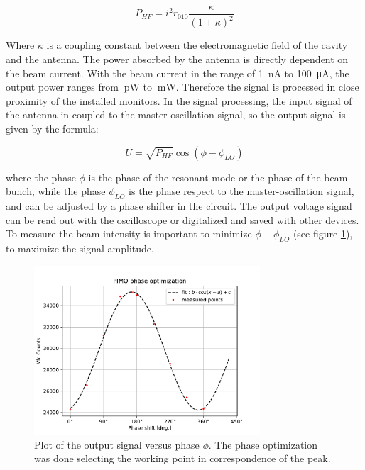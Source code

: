 \begin{equation}
P_{HF} = i^{2} r_{010} \frac{\kappa}{(1 + \kappa)^{2}}
\end{equation}

Where $\kappa$ is a coupling constant between the electromagnetic field of the cavity and the antenna.
The power absorbed by the antenna is directly dependent on the beam current. With the beam current in the range of \SI{1}{\nano \ampere} to \SI{100}{\micro \ampere}, the output power ranges from $\SI{}{\pico \watt}$ to $\SI{}{\milli \watt }$. Therefore the signal is processed in close proximity of the installed monitors. In the signal processing, the input signal of the antenna in coupled to the master-oscillation signal, so the output signal is given by the formula:

\begin{equation}
U = \sqrt{P_{HF}} \cos(\phi - \phi_{LO})
\end{equation}

where the phase $\phi$ is the phase of the resonant mode or the phase of the beam bunch, while the phase $\phi_{LO}$ is the phase respect to the master-oscillation signal, and can be adjusted by a phase shifter in the circuit. The output voltage signal can be read out with the oscilloscope or digitalized and saved with other devices. To measure the beam intensity is important to minimize $\phi - \phi_{LO}$ (see figure \ref{fig:PIMO}), to maximize the signal amplitude.

\begin{figure}[!hbtp]
\centering
\includegraphics[width = 0.75\textwidth]{ExperimentalSetup/PIMOphase.pdf}
\caption{Plot of the output signal versus phase $\phi$. The phase optimization was done selecting the working point in correspondence of the peak.}
\label{fig:PIMO}
\end{figure}

